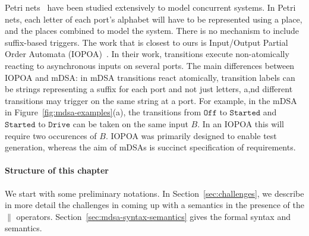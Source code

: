 Petri nets~\cite{CAPetri}
have been studied extensively to model concurrent systems. In Petri nets, each
letter of each port's alphabet will have to be represented using a place, and
the places combined to model the system. There is no mechanism to include suffix-based triggers. %
The work that is closest to ours is Input/Output Partial Order
Automata (IOPOA)~\cite{10.5555/2391293.2391305}. In their work, transitions
execute non-atomically reacting to asynchronous inputs on several ports. The
main differences between IOPOA and mDSA: in mDSA transitions react
atomically, transition labels can be strings representing a suffix for each port and not just letters,
a,nd different transitions may trigger on the same string at a port. For example, in the mDSA in Figure~\ref{fig:mdsa-examples}(a), the transitions from $\mathtt{Off}$ to $\mathtt{Started}$ and $\mathtt{Started}$ to $\mathtt{Drive}$ can be taken on the same input $B$. In an IOPOA this will require two occurences of $B$. IOPOA was primarily designed to enable test generation, whereas the aim of mDSAs is succinct specification of requirements.


\paragraph*{Structure of this chapter} We start with some preliminary notations. In Section~\ref{sec:challenges}, we describe in more detail the challenges in coming up with a semantics in the presence of the $\parallel$ operators. Section~\ref{sec:mdsa-syntax-semantics} gives the formal syntax and semantics.



